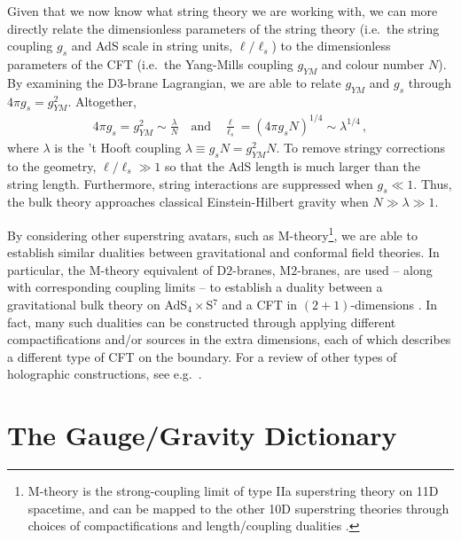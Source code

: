 \documentclass[../PhD.tex]{subfiles}
\begin{document}
Given that we now know what string theory we are working with, we can more directly relate the dimensionless parameters of the string theory (i.e.~the string coupling $g_s$ and AdS scale in string units, $\ell / \ell_s$) to the dimensionless parameters of the CFT (i.e.~the Yang-Mills coupling $g_{YM}$ and colour number $N$). By examining the D3-brane Lagrangian, we are able to relate $g_{YM}$ and $g_s$ through $4\pi g_s = g_{YM}^2$. Altogether,
\begin{align}
\label{params}
4\pi g_s = g_{YM}^2 \sim \frac{\lambda}{N} \quad \text{and} \quad \frac{\ell}{\ell_s} = \left( 4\pi g_s N \right)^{1/4} \sim \lambda^{1/4} \, ,
\end{align}
where $\lambda$ is the 't Hooft coupling $\lambda \equiv g_s N = g_{YM}^2 N$. To remove stringy corrections to the geometry, $\ell / \ell_s \gg 1$ so that the AdS length is much larger than the string length. Furthermore, string interactions are suppressed when $g_s \ll 1$. Thus, the bulk theory approaches  classical Einstein-Hilbert gravity when $N \gg \lambda \gg 1$.

By considering other superstring avatars, such as M-theory\footnote{M-theory is the strong-coupling limit of type IIa superstring theory on 11D spacetime, and can be mapped to the other 10D superstring theories through choices of compactifications and length/coupling dualities \cite{Polchinski:1998rr}.}, we are able to establish similar dualities between gravitational and conformal field theories. In particular, the M-theory equivalent of D$2$-branes, M$2$-branes, are used -- along with corresponding coupling limits -- to establish a duality between a gravitational bulk theory on AdS$_4 \times$S$^7$ and a CFT in $(2+1)$-dimensions \cite{hep-th/9711200}. In fact, many such dualities can be constructed through applying different compactifications and/or sources in the extra dimensions, each of which describes a different type of CFT on the boundary. For a review of other types of holographic constructions, see e.g.~\cite{1612.07324, 1501.00007}.

\vspace{-0.2in}


\section{The Gauge/Gravity Dictionary}
\label{ssec: dictionary}
\end{document}
